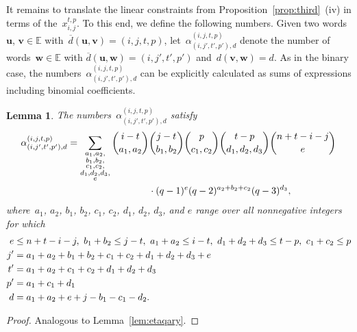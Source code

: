 \documentclass[10pt,a4paper]{article}
\newcommand{\E}{\mathbb{E}}
\newtheorem{lemma}[theorem]{Lemma}
\theoremstyle{definition}
\newcommand{\uu}{\mathbf{u}}
\newcommand{\vv}{\mathbf{v}}
\newcommand{\ww}{\mathbf{w}}
\begin{document}
It remains to translate the linear constraints from Proposition~\ref{prop:third}~(iv) in terms of the~$x_{i,j}^{t,p}$. To this end, we define the following numbers. Given two words~$\uu$, $\vv \in \E$ with~$\overline{d}(\uu,\vv) = (i,j,t,p)$, let~$\alpha_{(i,j',t',p'),d}^{(i,j,t,p)}$ denote the number of words~$\ww \in \E$ with $\overline{d}(\uu,\ww)=(i,j',t',p')$ and~$d(\vv,\ww) =d$. As in the binary case, the numbers~$\alpha_{(i,j',t',p'),d}^{(i,j,t,p)}$ can be explicitly calculated as sums of expressions including binomial coefficients.
\begin{lemma}\label{lem:alphaqary}
 The numbers~$\alpha_{(i,j',t',p'),d}^{(i,j,t,p)}$ satisfy
\begin{align}
\alpha_{(i,j',t',p'),d}^{(i,j,t,p)} =  \sum_{\substack{a_1,a_2,\\b_1,b_2,\\c_1,c_2,\\d_1,d_2,d_3,\\e}} \binom{i-t}{a_1,a_2}&\binom{j-t}{b_1,b_2}\binom{p}{c_1,c_2}\binom{t-p}{d_1,d_2,d_3}\binom{n+t-i-j}{e}\notag\\&\cdot(q-1)^e (q-2)^{a_2+b_2+c_2}(q-3)^{d_3},
\end{align}
where~$a_1$, $a_2$, $b_1$, $b_2$, $c_1$, $c_2$, $d_1$, $d_2$, $d_3$, and $e$ range over all nonnegative integers for which
\begin{align}
e &\leq n+t-i-j, \,\, b_1+b_2 \leq j-t, \,\, a_1+a_2 \leq i-t, \,\, d_1+d_2+d_3 \leq t-p, \,\, c_1+c_2 \leq p\\ 
j' &= a_1+a_2+b_1+b_2+c_1+c_2+d_1+d_2+d_3+e \notag\\
t'&= a_1+a_2+c_1+c_2+d_1+d_2+d_3\notag\\
p'&= a_1+c_1+d_1\notag\\
d&= a_1+a_2+e+j-b_1-c_1-d_2.\notag
\end{align}
\end{lemma}
\begin{proof} 
Analogous to Lemma~\ref{lem:etaqary}.
\end{proof} 
\end{document}
